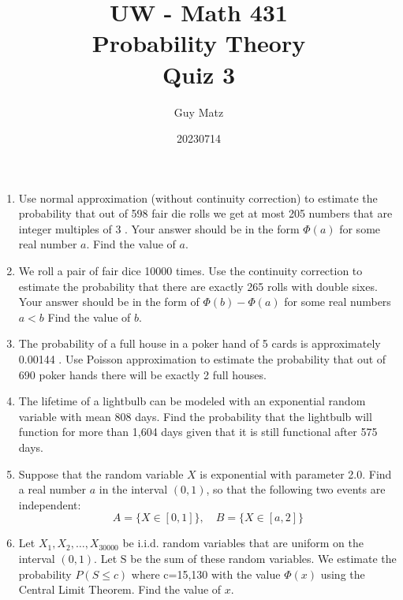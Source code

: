 \documentclass[10pt]{article}
\title{UW - Math 431 \\
Probability Theory \\
Quiz 3}
\author{Guy Matz}
\date{20230714}
\begin{document}
\maketitle
\begin{enumerate}

  \item Use normal approximation (without continuity correction) to estimate the probability that out of 598 fair die rolls we get at most 205 numbers that are integer multiples of 3 . Your answer should be in the form $\Phi(a)$ for some real number $a$.
Find the value of $a$.
\newpage
  \item We roll a pair of fair dice 10000 times. Use the continuity correction to estimate the probability that there are exactly 265 rolls with double sixes. Your answer should be in the form of $\Phi(b)-\Phi(a)$ for some real numbers $a<b$
Find the value of $b$.

\newpage
  \item The probability of a full house in a poker hand of 5 cards is approximately 0.00144 . Use Poisson approximation to estimate the probability that out of 690 poker hands there will be exactly 2 full houses.
\newpage
  \item The lifetime of a lightbulb can be modeled with an exponential random variable with mean 808 days. Find the probability that the lightbulb will function for more than 1,604 days given that it is still functional after 575 days.
\newpage
  \item Suppose that the random variable $X$ is exponential with parameter 2.0. Find a real number $a$ in the interval $(0,1)$, so that the following two events are independent:
$$
A=\{X \in[0,1]\}, \quad B=\{X \in[a, 2]\}
$$
\newpage
  \item Let $X_1, X_2, \ldots, X_{30000}$ be i.i.d. random variables that are uniform on the interval $(0,1)$. Let $\mathrm{S}$ be the sum of these random variables. We estimate the probability $P(S \leq c)$ where c=15,130 with the value $\Phi(x)$ using the Central Limit Theorem. Find the value of $x$.
\end{enumerate}
\end{document}

